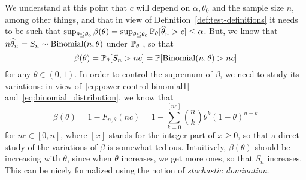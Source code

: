 We understand at this point that $c$ will depend on $\alpha, \theta_0$ and the sample size $n$, among other things, and that in view of Definition~\ref{def:test-definitions} it needs to be such that $\sup_{\theta \leq \theta_0} \beta(\theta) = \sup_{\theta \leq \theta_0} \P_\theta[\wh \theta_n > c] \leq \alpha$.
But, we know that $n \wh \theta_n = S_n \sim \bin(n, \theta)$ under $\P_\theta$%
%
, so that
\begin{equation}
	\label{eq:power-control-binomial1}
	\beta(\theta) = \P_\theta[S_n > n c] = \P [\bin(n, \theta) > nc]
\end{equation}
for any $\theta \in (0, 1)$.%
%
In order to control the supremum of $\beta$, we need to study its variations: in view of~\eqref{eq:power-control-binomial1} and~\eqref{eq:binomial_distribution}, we know that
\begin{equation}
	\label{eq:binomial-power}
	\beta(\theta) = 1 - F_{n, \theta}(n c) = 1 - \sum_{k=0}^{[n c]}\binom{n}{k} \theta^k (1 - \theta)^{n - k}
\end{equation}
for $nc \in [0, n]$, where $[x]$ stands for the integer part of $x \geq 0$, so that a direct study of the variations of $\beta$ is somewhat tedious.
Intuitively, $\beta(\theta)$ should be increasing with $\theta$, since when $\theta$ increases, we get more ones, so that $S_n$ increases.
This can be nicely formalized using the notion of \emph{stochastic domination}.
